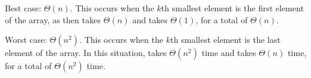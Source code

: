\begin{prob}
\begin{subprobset}
\begin{subprob}
            \begin{soln}
                Best case: $\Theta(n)$. This occurs when the $k$th smallest element is the first element of the array,
                as then  takes $\Theta(n)$ and  takes $\Theta(1)$,
                for a total of $\Theta(n)$.

                Worst case: $\Theta(n^2)$. This occurs when the $k$th smallest element is the last element of the
                array. In this situation,  takes $\Theta(n^2)$ time and 
                takes $\Theta(n)$ time, for a total of $\Theta(n^2)$ time.
            \end{soln}
        \end{subprob}

    \end{subprobset}


\end{prob}
